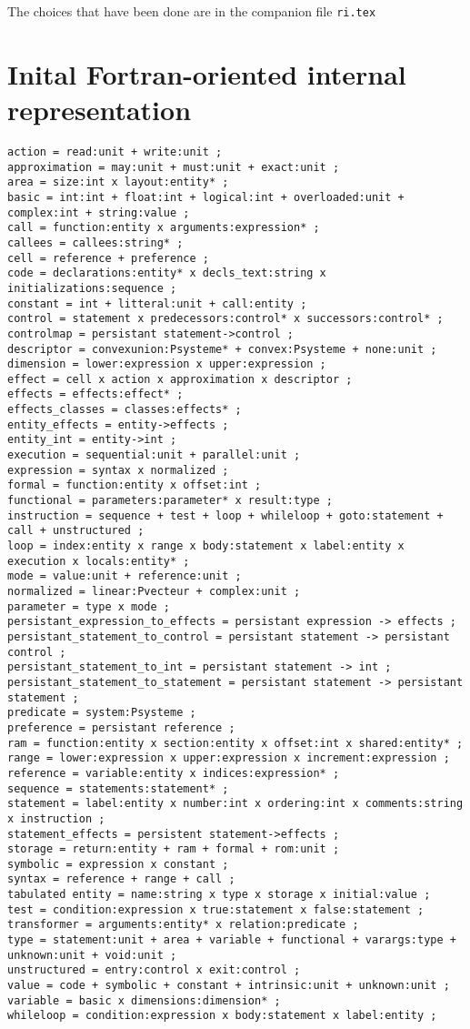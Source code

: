 \documentclass[a4paper]{report}
\begin{document}
\nocite{Kern78, Necu02}

The choices that have been done are in the companion file \texttt{ri.tex}


\appendix{}

\chapter{Inital Fortran-oriented internal representation}

\begin{verbatim}
action = read:unit + write:unit ;
approximation = may:unit + must:unit + exact:unit ;
area = size:int x layout:entity* ;
basic = int:int + float:int + logical:int + overloaded:unit + complex:int + string:value ;
call = function:entity x arguments:expression* ;
callees = callees:string* ;
cell = reference + preference ;
code = declarations:entity* x decls_text:string x initializations:sequence ;
constant = int + litteral:unit + call:entity ;
control = statement x predecessors:control* x successors:control* ;
controlmap = persistant statement->control ;
descriptor = convexunion:Psysteme* + convex:Psysteme + none:unit ;
dimension = lower:expression x upper:expression ;
effect = cell x action x approximation x descriptor ;
effects = effects:effect* ;
effects_classes = classes:effects* ;
entity_effects = entity->effects ;
entity_int = entity->int ;
execution = sequential:unit + parallel:unit ;
expression = syntax x normalized ;
formal = function:entity x offset:int ;
functional = parameters:parameter* x result:type ;
instruction = sequence + test + loop + whileloop + goto:statement + call + unstructured ;
loop = index:entity x range x body:statement x label:entity x execution x locals:entity* ;
mode = value:unit + reference:unit ;
normalized = linear:Pvecteur + complex:unit ;
parameter = type x mode ;
persistant_expression_to_effects = persistant expression -> effects ;
persistant_statement_to_control = persistant statement -> persistant control ;
persistant_statement_to_int = persistant statement -> int ;
persistant_statement_to_statement = persistant statement -> persistant statement ;
predicate = system:Psysteme ;
preference = persistant reference ;
ram = function:entity x section:entity x offset:int x shared:entity* ;
range = lower:expression x upper:expression x increment:expression ;
reference = variable:entity x indices:expression* ;
sequence = statements:statement* ;
statement = label:entity x number:int x ordering:int x comments:string x instruction ;
statement_effects = persistent statement->effects ;
storage = return:entity + ram + formal + rom:unit ;
symbolic = expression x constant ;
syntax = reference + range + call ;
tabulated entity = name:string x type x storage x initial:value ;
test = condition:expression x true:statement x false:statement ;
transformer = arguments:entity* x relation:predicate ;
type = statement:unit + area + variable + functional + varargs:type + unknown:unit + void:unit ;
unstructured = entry:control x exit:control ;
value = code + symbolic + constant + intrinsic:unit + unknown:unit ;
variable = basic x dimensions:dimension* ;
whileloop = condition:expression x body:statement x label:entity ;
\end{verbatim}
\end{document}
